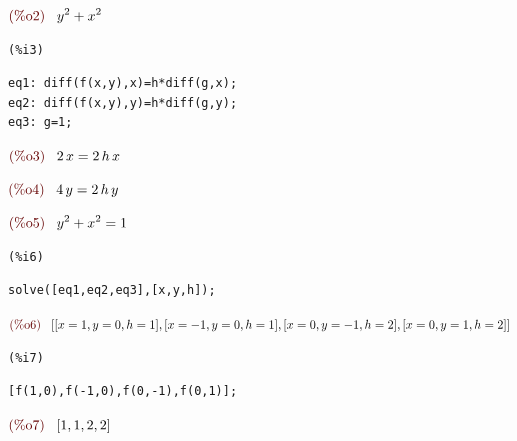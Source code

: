 \documentclass[12pt]{article}
\begin{document}
\begin{math}\displaystyle
\parbox{8ex}{\color{labelcolor}(\%o2) }
{y}^{2}+{x}^{2}
\end{math}


\noindent
\begin{minipage}[t]{8ex}{\color{red}\bf
\begin{verbatim}
(%i3) 
\end{verbatim}}
\end{minipage}
\begin{minipage}[t]{\textwidth}{\color{blue}
\begin{verbatim}
eq1: diff(f(x,y),x)=h*diff(g,x);
eq2: diff(f(x,y),y)=h*diff(g,y);
eq3: g=1;
\end{verbatim}}
\end{minipage}
\begin{math}\displaystyle
\parbox{8ex}{\color{labelcolor}(\%o3) }
2\,x=2\,h\,x
\end{math}

\begin{math}\displaystyle
\parbox{8ex}{\color{labelcolor}(\%o4) }
4\,y=2\,h\,y
\end{math}

\begin{math}\displaystyle
\parbox{8ex}{\color{labelcolor}(\%o5) }
{y}^{2}+{x}^{2}=1
\end{math}


\noindent
\begin{minipage}[t]{8ex}{\color{red}\bf
\begin{verbatim}
(%i6) 
\end{verbatim}}
\end{minipage}
\begin{minipage}[t]{\textwidth}{\color{blue}
\begin{verbatim}
solve([eq1,eq2,eq3],[x,y,h]);
\end{verbatim}}
\end{minipage}
\begin{math}\displaystyle
\parbox{8ex}{\color{labelcolor}(\%o6) }
[[x=1,y=0,h=1],[x=-1,y=0,h=1],[x=0,y=-1,h=2],[x=0,y=1,h=2]]
\end{math}


\noindent
\begin{minipage}[t]{8ex}{\color{red}\bf
\begin{verbatim}
(%i7) 
\end{verbatim}}
\end{minipage}
\begin{minipage}[t]{\textwidth}{\color{blue}
\begin{verbatim}
[f(1,0),f(-1,0),f(0,-1),f(0,1)];
\end{verbatim}}
\end{minipage}
\begin{math}\displaystyle
\parbox{8ex}{\color{labelcolor}(\%o7) }
[1,1,2,2]
\end{math}
\end{document}
